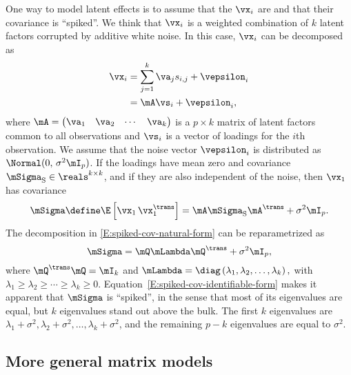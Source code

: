 One way to model latent effects is to assume that the $\vx_i$ are \iid and
that their covariance is ``spiked''. We think that $\vx_i$ is a weighted
combination of $k$ latent factors corrupted by additive white noise. In this
case, $\vx_i$ can be decomposed as
\begin{align}
    \vx_i
        &=
        \sum_{j=1}^k
            \va_j
            s_{i,j}
        +
        \vepsilon_i \notag \\
        &=
        \mA \vs_i + \vepsilon_i,
\end{align}
where
\(
    \mA
    =
    \left(
    \begin{matrix}
        \va_1 & \va_2 & \cdots & \va_k
    \end{matrix}
    \right)
\)
is a $p \times k$ matrix of latent factors common to all observations and
$\vs_i$ is a vector of loadings for the $i$th observation. We assume that the
noise vector $\vepsilon_i$ is distributed as $\Normal( 0, \, \sigma^2 \mI_p
)$. If the loadings have mean zero and covariance $\mSigma_\text{S} \in
\reals^{k \times k}$, and if they are also independent of the noise, then
$\vx_1$ has covariance
\begin{equation}\label{E:spiked-cov-natural-form}
    \mSigma
        \define
        \E \left[ \vx_1 \, \vx_1^\trans \right]
            =
                \mA \mSigma_\text{S} \mA^\trans
                +
                \sigma^2
                \mI_p.
\end{equation}
The decomposition in \eqref{E:spiked-cov-natural-form} can be reparametrized
as
\begin{equation}\label{E:spiked-cov-identifiable-form}
    \mSigma
        =
        \mQ \mLambda \mQ^\trans
        +
        \sigma^2
        \mI_p,
\end{equation}
where $\mQ^\trans \mQ = \mI_k$ and
\(
    \mLambda
        = 
        \diag \left( \lambda_1, \lambda_2, \ldots, \lambda_k \right),
\)
with $\lambda_1 \geq \lambda_2 \geq \cdots \geq \lambda_k \geq 0$.
Equation~\eqref{E:spiked-cov-identifiable-form} makes it apparent that
$\mSigma$ is ``spiked'', in the sense that most of its eigenvalues are equal,
but $k$ eigenvalues stand out above the bulk. The first $k$ eigenvalues are
$\lambda_1 + \sigma^2, \lambda_2 + \sigma^2, \ldots, \lambda_k + \sigma^2$,
and the remaining $p-k$ eigenvalues are equal to $\sigma^2$.

\subsection{More general matrix models}

